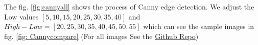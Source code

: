 \documentclass[final]{cvpr}
\begin{document}
\begin{appendices}
The fig. \ref{fig:cannyall} shows the process of Canny edge detection. We adjust the Low values $[5,10,15,20,25,30,35,40]$ and $High-Low=[20,25,30,35,40,45,50,55]$ which can see the sample images in fig. \ref{fig: Cannycompare} (For all images See the \href{https://github.com/Arctic-Xiangjian/assignment2/tree/main/findbestcanny}{Github Repo})
\begin{figure}[h]
  \centering
  \quad
  \quad
  \quad
  \quad
  \quad
\end{figure}
\end{appendices}
\end{document}
